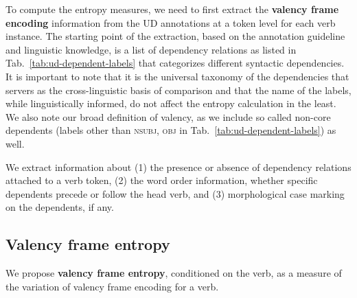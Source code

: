 To compute the entropy measures, we need to first extract the \textbf{valency frame encoding} information from the UD annotations at a token level for each verb instance. The starting point of the extraction, based on the annotation guideline and linguistic knowledge, is a list of dependency relations as listed in Tab.~\ref{tab:ud-dependent-labels} that categorizes different syntactic dependencies. It is important to note that it is the universal taxonomy of the dependencies that servers as the cross-linguistic basis of comparison and that the name of the labels, while linguistically informed, do not affect the entropy calculation in the least. We also note our broad definition of valency, as we include so called non-core dependents (labels other than \textsc{nsubj}, \textsc{obj} in Tab.~\ref{tab:ud-dependent-labels}) as well. 

We extract information about (1) the presence or absence of dependency relations attached to a verb token, (2) the word order information, whether specific dependents precede or follow the head verb, and (3) morphological case marking on the dependents, if any.



\subsection{Valency frame entropy}

We propose \textbf{valency frame entropy}, conditioned on the verb, as a measure of the variation of valency frame encoding for a verb. 








